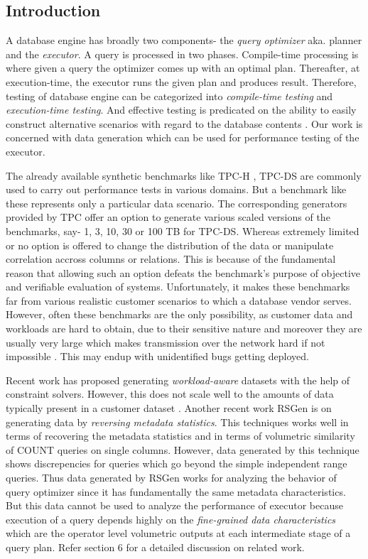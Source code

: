\documentclass[]{article}
\begin{document}
	\begin{multicols}{2}
	\section{Introduction}
		A database engine has broadly two components- the \textit{query optimizer} aka. planner and the \textit{executor}.
		A query is processed in two phases. 
		Compile-time processing is where given a query the optimizer comes up with an optimal plan. 
		Thereafter, at execution-time, the executor runs the given plan and produces result.
		Therefore, testing of database engine can be categorized into \textit{compile-time testing} and \textit{execution-time testing}.
		And effective testing is predicated on the ability to easily construct alternative scenarios with regard to the database contents \cite{codd}. 
		Our work is concerned with data generation which can be used for performance testing of the executor.  
		
		The already available synthetic benchmarks like TPC-H \cite{tpch}, TPC-DS \cite{tpcds} are commonly used to carry out performance tests in various domains. 
		But a benchmark like these represents only a particular data scenario. 
		The corresponding generators provided by TPC offer an option to generate various scaled versions of the benchmarks, say- 1, 3, 10, 30 or 100 TB for TPC-DS.
		Whereas extremely limited or no option is offered to change the distribution of the data or manipulate correlation accross columns or relations. 
		This is because of the fundamental reason that allowing such an option defeats the benchmark's purpose of objective and verifiable evaluation of systems. 
		Unfortunately, it makes these benchmarks far from various realistic customer scenarios to which a database vendor serves. 
		However, often these benchmarks are the only possibility, as customer data and workloads are hard to obtain, due to their sensitive nature and moreover they are usually very large which makes transmission over the network hard if not impossible \cite{rsgen}.
		This may endup with unidentified bugs getting deployed. 

		Recent work \cite{arasu} has proposed generating \textit{workload-aware} datasets with the help of constraint solvers. 
		However, this does not scale well to the amounts of data typically present in a customer dataset \cite{rsgen}. 
		Another recent work RSGen \cite{rsgen} is on generating data by \textit{reversing metadata statistics}. 
		This techniques works well in terms of recovering the metadata statistics and in terms of volumetric similarity of COUNT queries on single columns.
		However, data generated by this technique shows discrepencies for queries which go beyond the simple independent range queries. 
		Thus data generated by RSGen works for analyzing the behavior of query optimizer since it has fundamentally the same metadata characteristics. 
		But this data cannot be used to analyze the performance of executor because execution of a query depends highly on the \textit{fine-grained data characteristics} which are the operator level volumetric outputs at each intermediate stage of a query plan. 
		Refer section 6 for a detailed discussion on related work. 
		

\end{multicols}
\end{document}
